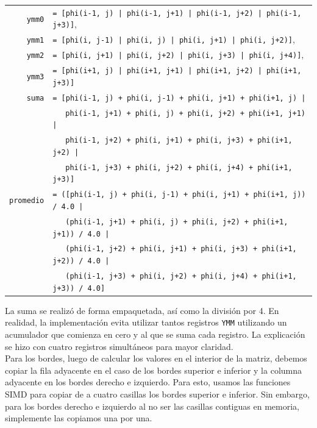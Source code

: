 \documentclass[a4paper]{article}
\begin{document}
\begin{table}[!htbp]
\begin{tabular}{rl}
\texttt{ymm0} & \texttt{= [phi(i-1, j) | phi(i-1, j+1) | phi(i-1, j+2) | phi(i-1, j+3)]}, \\
\texttt{ymm1} & \texttt{= [phi(i, j-1) | phi(i, j) | phi(i, j+1) | phi(i, j+2)]}, \\
\texttt{ymm2} & \texttt{= [phi(i, j+1) | phi(i, j+2) | phi(i, j+3) | phi(i, j+4)]}, \\
\texttt{ymm3} & \texttt{= [phi(i+1, j) | phi(i+1, j+1) | phi(i+1, j+2) | phi(i+1, j+3)]} \\
\texttt{suma} & \texttt{= [phi(i-1, j) + phi(i, j-1) + phi(i, j+1) + phi(i+1, j) |} \\
 & \ \ \ \texttt{phi(i-1, j+1) + phi(i, j) + phi(i, j+2) + phi(i+1, j+1) |} \\
 & \ \ \ \texttt{phi(i-1, j+2) + phi(i, j+1) + phi(i, j+3) + phi(i+1, j+2) |} \\
 & \ \ \ \texttt{phi(i-1, j+3) + phi(i, j+2) + phi(i, j+4) + phi(i+1, j+3)]} \\
\texttt{promedio} & \texttt{= ([phi(i-1, j) + phi(i, j-1) + phi(i, j+1) + phi(i+1, j)) / 4.0 |} \\
 & \ \ \ \texttt{(phi(i-1, j+1) + phi(i, j) + phi(i, j+2) + phi(i+1, j+1)) / 4.0 |} \\
 & \ \ \ \texttt{(phi(i-1, j+2) + phi(i, j+1) + phi(i, j+3) + phi(i+1, j+2)) / 4.0 |} \\
 & \ \ \ \texttt{(phi(i-1, j+3) + phi(i, j+2) + phi(i, j+4) + phi(i+1, j+3)) / 4.0]} \\
\end{tabular}
\end{table}

La suma se realizó de forma empaquetada, así como la división por 4. 
En realidad, la implementación evita utilizar tantos registros \texttt{YMM} 
utilizando un acumulador que comienza en cero y al que se suma cada 
registro. La explicación se hizo con cuatro registros simultáneos 
para mayor claridad. \\
Para los bordes, luego de calcular los valores en el interior de la matriz, debemos copiar la fila adyacente en el caso de los bordes superior e inferior y la columna adyacente en los bordes derecho e izquierdo. Para esto, usamos las funciones SIMD para copiar de a cuatro casillas los bordes superior e inferior. Sin embargo, para los bordes derecho e izquierdo al no ser las casillas contiguas en memoria, simplemente las copiamos una por una.	
\end{document}
